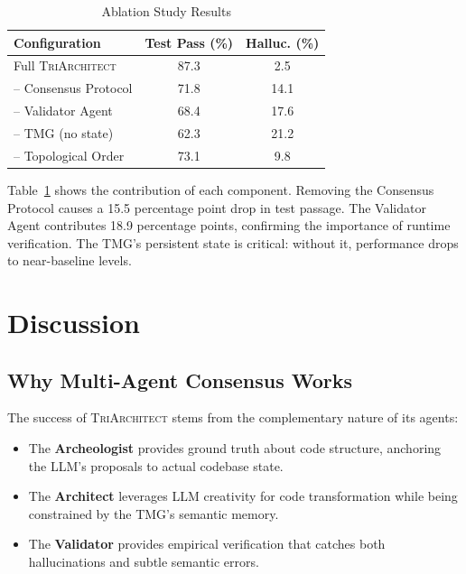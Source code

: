 \documentclass[sigconf,review,anonymous]{acmart}
\begin{document}
\begin{table}[t]
\caption{Ablation Study Results}
\label{tab:ablation}
\begin{tabular}{lcc}
\toprule
\textbf{Configuration} & \textbf{Test Pass (\%)} & \textbf{Halluc. (\%)} \\
\midrule
Full \textsc{TriArchitect} & 87.3 & 2.5 \\
\quad -- Consensus Protocol & 71.8 & 14.1 \\
\quad -- Validator Agent & 68.4 & 17.6 \\
\quad -- TMG (no state) & 62.3 & 21.2 \\
\quad -- Topological Order & 73.1 & 9.8 \\
\bottomrule
\end{tabular}
\end{table}

Table~\ref{tab:ablation} shows the contribution of each component. Removing the Consensus Protocol causes a 15.5 percentage point drop in test passage. The Validator Agent contributes 18.9 percentage points, confirming the importance of runtime verification. The TMG's persistent state is critical: without it, performance drops to near-baseline levels.

\section{Discussion}
\label{sec:discussion}

\subsection{Why Multi-Agent Consensus Works}

The success of \textsc{TriArchitect} stems from the complementary nature of its agents:

\begin{itemize}
    \item The \textbf{Archeologist} provides ground truth about code structure, anchoring the LLM's proposals to actual codebase state.
    
    \item The \textbf{Architect} leverages LLM creativity for code transformation while being constrained by the TMG's semantic memory.
    
    \item The \textbf{Validator} provides empirical verification that catches both hallucinations and subtle semantic errors.
\end{itemize}
\end{document}
